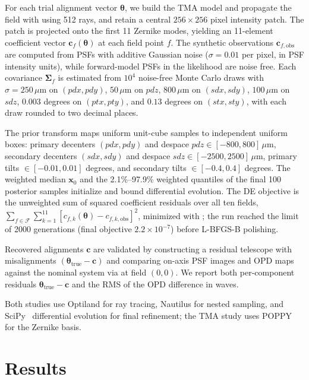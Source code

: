 \documentclass[fleqn,usenatbib]{rasti}
\begin{document}
For each trial alignment vector $\boldsymbol{\theta}$, we build the TMA model and propagate the field with  using 512 rays, and retain a central $256\times256$ pixel intensity patch. The patch is projected onto the first 11 Zernike modes, yielding an 11-element coefficient vector $\mathbf{c}_f(\boldsymbol{\theta})$ at each field point $f$. The synthetic observations $\mathbf{c}_{f,\mathrm{obs}}$ are computed from PSFs with additive Gaussian noise ($\sigma=0.01$ per pixel, in PSF intensity units), while forward-model PSFs in the likelihood are noise free. Each covariance $\boldsymbol{\Sigma}_f$ is estimated from $10^4$ noise-free Monte Carlo draws with $\sigma=250\,\mu\mathrm{m}$ on $(pdx,pdy)$, $50\,\mu\mathrm{m}$ on $pdz$, $800\,\mu\mathrm{m}$ on $(sdx,sdy)$, $100\,\mu\mathrm{m}$ on $sdz$, $0.003$ degrees on $(ptx,pty)$, and $0.13$ degrees on $(stx,sty)$, with each draw rounded to two decimal places.

The prior transform maps uniform unit-cube samples to independent uniform boxes: primary decenters $(pdx,pdy)$ and despace $pdz \in [-800,800]\,\mu\mathrm{m}$, secondary decenters $(sdx,sdy)$ and despace $sdz \in [-2500,2500]\,\mu\mathrm{m}$, primary tilts $\in [-0.01,0.01]$ degrees, and secondary tilts $\in [-0.4,0.4]$ degrees. The weighted median $\mathbf{x}_0$ and the 2.1\%--97.9\% weighted quantiles of the final 100 posterior samples initialize and bound differential evolution. The DE objective is the unweighted sum of squared coefficient residuals over all ten fields, $\sum_{f\in\mathcal{F}}\sum_{k=1}^{11}[c_{f,k}(\boldsymbol{\theta})-c_{f,k,\mathrm{obs}}]^2$, minimized with ; the run reached the limit of 2000 generations (final objective $2.2\times10^{-7}$) before L-BFGS-B polishing.

Recovered alignments $\mathbf{c}$ are validated by constructing a residual telescope with misalignments $(\boldsymbol{\theta}_{\mathrm{true}} - \mathbf{c})$ and comparing on-axis PSF images and OPD maps against the nominal system via  at field $(0,0)$. We report both per-component residuals $\boldsymbol{\theta}_{\mathrm{true}} - \mathbf{c}$ and the RMS of the OPD difference in waves.

Both studies use Optiland for ray tracing, Nautilus for nested sampling, and SciPy~\citep{Virtanen2020} differential evolution for final refinement; the TMA study uses POPPY~\citep{Perrin2012} for the Zernike basis.

\section{Results}
\end{document}
